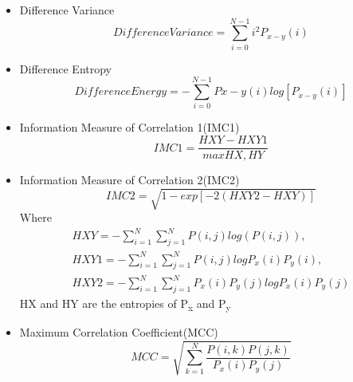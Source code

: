 \documentclass[review]{elsarticle}
\begin{document}
\begin{itemize}
	\item Difference Variance 
	\begin{equation}
	Difference Variance = \sum_{i=0}^{N-1}i^2 P_{x-y}(i)
	\end{equation}

	\item Difference Entropy 
	\begin{equation}
	Difference Energy= - \sum_{i=0}^{N-1} P{x-y}(i) log [P_{x-y}(i)]
	\end{equation}
	
	\item Information Measure of Correlation 1(IMC1)
	\begin{equation}
	IMC1= \dfrac{HXY-HXY1}{max{HX,HY}}
	\end{equation}
	
	\item Information Measure of Correlation 2(IMC2)
	\begin{equation}
	IMC2=\sqrt{ 1-exp[-2(HXY2-HXY)]}
	\end{equation}
	Where 
	\begin{equation}
	\begin{split}
	HXY=- \sum_{i=1}^N \sum_{j=1}^N P(i,j) log(P(i,j)),\\
	HXY1= -\sum_{i=1}^N \sum_{j=1}^N P(i,j) log{P_x(i)P_y(i)},\\
	HXY2=-\sum_{i=1}^N \sum_{j=1}^N P_x(i)P_y(j) log{P_x(i)P_y(j)}
	\end{split}
	\end{equation}
	HX and HY are the entropies of P\textsubscript{x} and P\textsubscript{y}
	
	\item Maximum Correlation Coefficient(MCC) 
	\begin{equation}
	MCC= \sqrt{\sum_{k=1}^N \dfrac{P(i,k)P(j,k)}{P_x(i)P_y(j)}}
	\end{equation}
\end{itemize}
\end{document}
